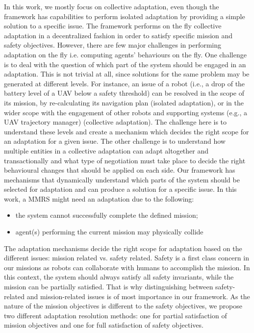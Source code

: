 \documentclass[journal]{IEEEtran}
\theoremstyle{definition}
\begin{document}
In this work, we mostly focus on collective adaptation, even though the framework has capabilities to perform isolated adaptation by providing a simple solution to a specific issue.
The framework performs on the fly collective adaptation in a decentralized fashion in order to satisfy specific mission and safety objectives.
However, there are few major challenges in performing adaptation on the fly i.e. computing agents' behaviours on the fly. One challenge is to deal with the question of which part of the system should be engaged in an adaptation. This is not trivial at all, since solutions for the same problem
may be generated at different levels. For instance, an issue of
a robot (i.e., a drop of the battery level of a UAV below a
safety threshold) can be resolved in the scope of its mission,
by re-calculating its navigation plan (isolated adaptation), or in the wider scope
with the engagement of other robots and supporting systems
(e.g., a UAV trajectory manager) (collective adaptation). The challenge here is to
understand these levels and create a mechanism which decides the right scope for an adaptation for a given issue.
The other challenge is to understand how  multiple
entities in a collective adaptation can adapt altogether and transactionally and what type of negotiation must take place to decide the right behavioural changes that should be applied on each side.
Our framework has mechanisms that dynamically understand  which  parts of the system  should be  selected  for adaptation and can produce a solution for a specific issue. 
 In this work, a MMRS might need 
 an adaptation due to the following:
\begin{itemize}
\item the system cannot successfully complete the defined mission;
\item agent(s) performing the current mission may physically collide 
\end{itemize}

The adaptation mechanisms decide the right scope  for  %
adaptation based on the different issues: mission related vs. safety related.
  Safety is a first class concern in our missions as robots can collaborate with humans to accomplish the mission. In this context, the system should always satisfy all safety invariants, while the mission can be partially satisfied.
  That is why distinguishing between safety-related and mission-related issues is of most importance in our framework.
 As the nature of the mission objectives is different to the safety objectives, we propose two different adaptation resolution methods: one for partial satisfaction of mission objectives and one for full satisfaction
of safety objectives. 
\end{document}
